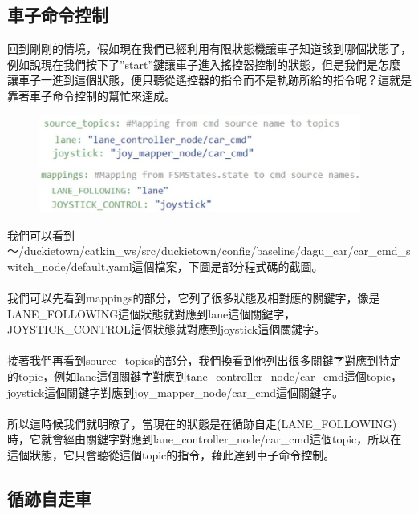 \documentclass{article}
\begin{document}
\subsection{車子命令控制}
回到剛剛的情境，假如現在我們已經利用有限狀態機讓車子知道該到哪個狀態了，例如說現在我們按下了”start”鍵讓車子進入搖控器控制的狀態，但是我們是怎麼讓車子一進到這個狀態，便只聽從遙控器的指令而不是軌跡所給的指令呢？這就是靠著車子命令控制的幫忙來達成。
\begin{figure}[htp]
    \begin{center}
        \includegraphics[width=300pt]{pic/圖片28.jpg}
    \end{center}
\end{figure}
我們可以看到～/duckietown/catkin\_ws/src/duckietown/config/baseline/dagu\_car/car\_cmd\_switch\_node/default.yaml這個檔案，下圖是部分程式碼的截圖。
\\
\\我們可以先看到mappings的部分，它列了很多狀態及相對應的關鍵字，像是LANE\_FOLLOWING這個狀態就對應到lane這個關鍵字，JOYSTICK\_CONTROL這個狀態就對應到joystick這個關鍵字。
\\
\\接著我們再看到source\_topics的部分，我們換看到他列出很多關鍵字對應到特定的topic，例如lane這個關鍵字對應到tane\_controller\_node/car\_cmd這個topic，joystick這個關鍵字對應到joy\_mapper\_node/car\_cmd這個關鍵字。
\\
\\所以這時候我們就明瞭了，當現在的狀態是在循跡自走(LANE\_FOLLOWING)時，它就會經由關鍵字對應到lane\_controller\_node/car\_cmd這個topic，所以在這個狀態，它只會聽從這個topic的指令，藉此達到車子命令控制。
\\

\subsection{循跡自走車}
\end{document}
